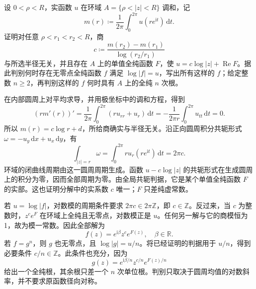 \begin{exercise}[由圆周均值识别环域中的障碍]\label{b3:ex:15-draft-01}
设 \(0<\rho<R\)，实函数 \(u\) 在环域 \(A=\{\rho<|z|<R\}\) 调和，记
\[
 m(r)\coloneqq\frac1{2\pi}\int_0^{2\pi}u(re^{\mathrm it})\,\mathrm dt.
\]
证明对任意 \(\rho<r_1<r_2<R\)，商
\[
 c\coloneqq\frac{m(r_2)-m(r_1)}{\log(r_2/r_1)}
\]
与所选半径无关，并且存在 \(A\) 上的单值全纯函数 \(F\)，使 \(u=c\log|z|+\operatorname{Re}F\)。据此判别何时存在无零点全纯函数 \(f\) 满足 \(\log|f|=u\)，写出所有这样的 \(f\)；给定整数 \(n\ge2\)，再判别这样的 \(f\) 何时具有 \(A\) 上的全纯 \(n\) 次根。
\end{exercise}
\begin{solution}
在内部圆周上对平均求导，并用极坐标中的调和方程，得到
\[
 (rm'(r))'
 =\frac1{2\pi}\int_0^{2\pi}(ru_{rr}+u_r)\,\mathrm dt
 =-\frac1{2\pi r}\int_0^{2\pi}u_{tt}\,\mathrm dt=0.
\]
所以 \(m(r)=c\log r+d\)，所给商确实与半径无关。沿正向圆周积分共轭形式 \(\omega=-u_y\,\mathrm dx+u_x\,\mathrm dy\)，有
\[
 \int_{|z|=r}\omega
 =\int_0^{2\pi}r u_r(re^{\mathrm it})\,\mathrm dt=2\pi c.
\]
环域的闭曲线周期由这一圆周周期生成。函数 \(u-c\log|z|\) 的共轭形式在生成圆周上的积分为零，因而全部周期为零。由全局共轭判据，它是某个单值全纯函数 \(F\) 的实部。这也证明分解中的实系数 \(c\) 唯一；\(F\) 只差纯虚常数。

若 \(u=\log|f|\)，对数模的周期条件要求 \(2\pi c\in2\pi\mathbb Z\)，即 \(c\in\mathbb Z\)。反过来，当 \(c\) 为整数时，\(z^c e^F\) 在环域上全纯且无零点，对数模正是 \(u\)。任何另一解与它的商模恒为1，故为模一常数。因此全部解为
\[
 f(z)=e^{\mathrm i\beta}z^c e^{F(z)},\quad \beta\in\mathbb R.
\]
若 \(f=g^n\)，则 \(g\) 也无零点，且 \(\log|g|=u/n\)。将已经证明的判据用于 \(u/n\)，得到必要条件 \(c/n\in\mathbb Z\)。此条件也充分，因为
\[
 g(z)=e^{\mathrm i\beta/n}z^{c/n}e^{F(z)/n}
\]
给出一个全纯根，其余根只差一个 \(n\) 次单位根。判别只取决于圆周均值的对数斜率，并不要求原函数径向对称。
\end{solution}

